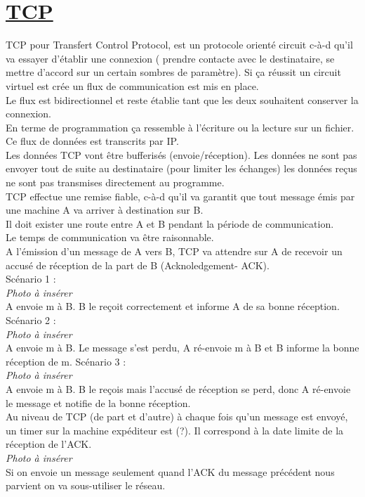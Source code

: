 \documentclass{article}
\begin{document}
\section{\underline{TCP}}
 TCP pour Transfert Control Protocol, est un protocole orienté circuit c-à-d qu'il va essayer d'établir une connexion ( prendre contacte avec le destinataire, se mettre d'accord sur un certain sombres de paramètre). Si ça réussit un circuit virtuel est crée un flux de communication est mis en place. \\
Le flux est bidirectionnel et reste établie tant que les deux souhaitent conserver la connexion. \\
En terme de programmation ça ressemble à l'écriture ou la lecture sur un fichier. Ce flux de données est transcrits par IP. \\
Les données TCP vont être bufferisés (envoie/réception). Les données ne sont pas envoyer tout de suite au destinataire (pour limiter les échanges) les données reçus ne sont pas transmises directement au programme. \\
TCP effectue une remise fiable, c-à-d qu'il va garantit que tout message émis par une machine A va arriver à destination sur B. \\
Il doit exister une route entre A et B pendant la période de communication. \\
Le temps de communication va être raisonnable. \\
A l'émission d'un message de A vers B, TCP va attendre sur A de recevoir un accusé de réception de la part de B (Acknoledgement- ACK). \\ 
Scénario 1 : \\
\emph{Photo à insérer} \\
A envoie m à B. B le reçoit correctement et informe A de sa bonne réception.\\
Scénario 2 : \\
\emph{Photo à insérer} \\
A envoie m à B. Le message s'est perdu, A ré-envoie m à B et B informe la bonne réception de m.
Scénario 3 : \\
\emph{Photo à insérer} \\
A envoie m à B. B le reçois mais l'accusé de réception se perd, donc A ré-envoie le message et notifie de la bonne réception. \\
\newpage
Au niveau de TCP (de part et d'autre) à chaque fois qu'un message est envoyé, un timer sur la machine expéditeur est (?). Il correspond à la date limite de la réception de l'ACK. \\
\emph{Photo à insérer} \\
Si on envoie un message seulement quand l'ACK du message précédent nous parvient on va sous-utiliser le réseau. \\
\end{document}
